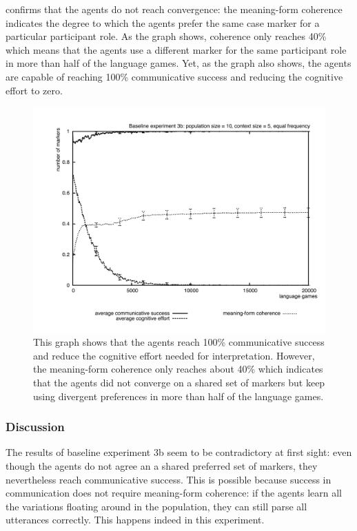 \largerpage
{} confirms that the agents do not reach convergence: the meaning-form coherence indicates the degree to which the agents prefer the same case marker for a particular participant role. As the graph shows, coherence only reaches 40\% which means that the agents use a different marker for the same participant role in more than half of the language games. Yet, as the graph also shows, the agents are capable of reaching 100\% communicative success  and reducing the cognitive effort to zero.
\begin{figure}[t]
\centerline{\includegraphics[width=\textwidth]{Chapter3/figs/graph-base3-effort3b}}
  \caption[Baseline experiment 3b: success, effort and coherence]{This graph shows that the agents reach 100\% communicative success and reduce the cognitive effort needed for interpretation. However, the meaning-form coherence only reaches about 40\% which indicates that the agents did not converge on a shared set of markers but keep using divergent preferences in more than half of the language games.}
   \label{f:base3-effort3b}
\end{figure}


\subsubsection{Discussion}
 The results of baseline experiment 3b seem to be contradictory at first sight: even though the agents do not agree an a shared preferred set of markers, they nevertheless reach communicative success. This is possible because success in communication does not require meaning-form coherence: if the agents learn all the variations floating around in the population, they can still parse all utterances correctly. This happens indeed in this experiment.

